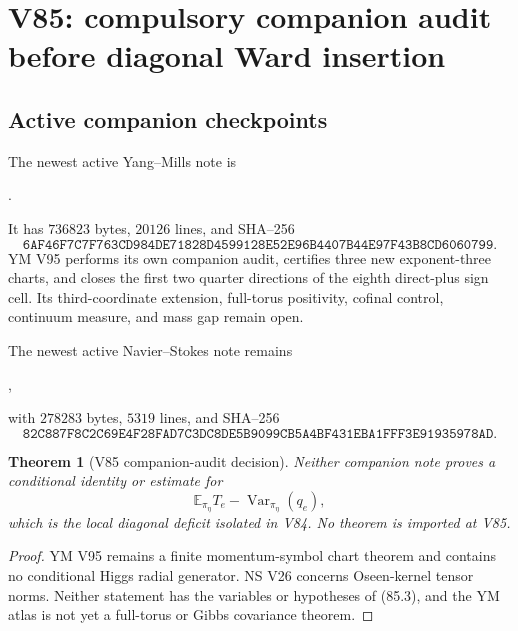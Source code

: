 \documentclass[11pt]{article}
\newtheorem{theorem}{Theorem}[section]
\theoremstyle{remark}
\begin{document}
\section{V85: compulsory companion audit before diagonal Ward insertion}
\label{sec:v17v85}

\subsection{Active companion checkpoints}

The newest active Yang--Mills note is
\begin{center}\small
{}.
\end{center}
It has \(736823\) bytes, \(20126\) lines, and SHA--256
\[
 \texttt{6AF46F7C7F763CD984DE71828D4599128E52E96B4407B44E97F43B8CD6060799}.
                                                               \tag{85.1}
\]
YM V95 performs its own companion audit, certifies three new
exponent-three charts, and closes the first two quarter directions of
the eighth direct-plus sign cell.  Its third-coordinate extension,
full-torus positivity, cofinal control, continuum measure, and mass gap
remain open.

The newest active Navier--Stokes note remains
\begin{center}\small
{},
\end{center}
with \(278283\) bytes, \(5319\) lines, and SHA--256
\[
 \texttt{82C887F8C2C69E4F28FAD7C3DC8DE5B9099CB5A4BF431EBA1FFF3E91935978AD}.
                                                               \tag{85.2}
\]

\begin{theorem}[V85 companion-audit decision]
\label{thm:v17v85-decision}
Neither companion note proves a conditional identity or estimate for
\[
 \mathbb E_{\pi_\eta}T_e-
 \operatorname{Var}_{\pi_\eta}(q_e),              \tag{85.3}
\]
which is the local diagonal deficit isolated in V84.  No theorem is
imported at V85.
\end{theorem}

\begin{proof}
YM V95 remains a finite momentum-symbol chart theorem and contains no
conditional Higgs radial generator.  NS V26 concerns Oseen-kernel
tensor norms.  Neither statement has the variables or hypotheses of
(85.3), and the YM atlas is not yet a full-torus or Gibbs covariance
theorem.
\end{proof}
\end{document}
